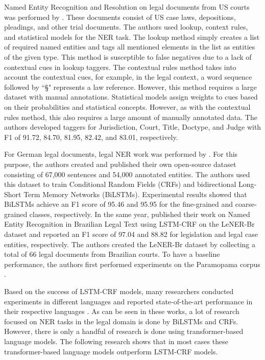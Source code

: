 \documentclass[a4paper,twoside]{article}
\begin{document}
Named Entity Recognition and Resolution on legal documents from US courts was performed by \cite{dozier2010named}. These documents consist of US case laws, depositions, pleadings, and other trial documents. The authors used lookup, context rules, and statistical models for the NER task. The lookup method simply creates a list of required named entities and tags all mentioned elements in the list as entities of the given type. This method is susceptible to false negatives due to a lack of contextual cues in lookup taggers. The contextual rules method takes into account the contextual cues, for example, in the legal context, a word sequence followed by ``§" represents a law reference. However, this method requires a large dataset with manual annotations. Statistical models assign weights to cues based on their probabilities and statistical concepts. However, as with the contextual rules method, this also requires a large amount of manually annotated data. The authors developed taggers for Jurisdiction, Court, Title, Doctype, and Judge with F1 of 91.72, 84.70, 81.95, 82.42, and 83.01, respectively.

For German legal documents, legal NER work was performed by \cite{leitner2019fine}. For this purpose, the authors created and published their own open-source dataset consisting of 67,000 sentences and 54,000 annotated entities. The authors used this dataset to train Conditional Random Fields (CRFs) and bidirectional Long-Short Term Memory Networks (BiLSTMs). Experimental results showed that BiLSTMs achieve an F1 score of 95.46 and 95.95 for the fine-grained and coarse-grained classes, respectively. In the same year, \cite{luz2018lener} published their work on Named Entity Recognition in Brazilian Legal Text using LSTM-CRF on the LeNER-Br dataset and reported an F1 score of 97.04 and 88.82 for legislation and legal case entities, respectively. The authors created the LeNER-Br dataset by collecting a total of 66 legal documents from Brazilian courts. To have a baseline performance, the authors first performed experiments on the Paramopama corpus \cite{junior2015paramopama}. 

Based on the success of LSTM-CRF models, many researchers conducted experiments in different languages and reported state-of-the-art performance in their respective languages \cite{paislegalnero,ccetindaug2022named}. As can be seen in these works, a lot of research focused on NER tasks in the legal domain is done by BiLSTMs and CRFs. However, there is only a handful of research is done using transformer-based language models. The following research shows that in most cases these transformer-based language models outperform LSTM-CRF models.
\end{document}
